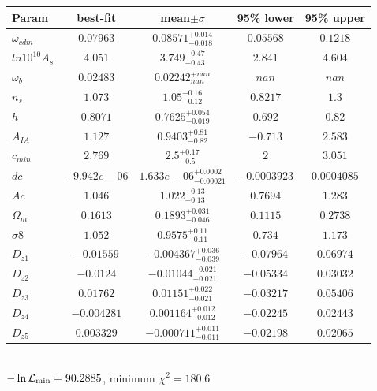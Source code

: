 \begin{tabular}{|l|c|c|c|c|} 
 \hline 
Param & best-fit & mean$\pm\sigma$ & 95\% lower & 95\% upper \\ \hline 
$\omega_{cdm }$ &$0.07963$ & $0.08571_{-0.018}^{+0.014}$ & $0.05568$ & $0.1218$ \\ 
$ln10^{10}A_{s }$ &$4.051$ & $3.749_{-0.43}^{+0.47}$ & $2.841$ & $4.604$ \\ 
$\omega_{b }$ &$0.02483$ & $0.02242_{nan}^{+nan}$ & $nan$ & $nan$ \\ 
$n_{s }$ &$1.073$ & $1.05_{-0.12}^{+0.16}$ & $0.8217$ & $1.3$ \\ 
$h$ &$0.8071$ & $0.7625_{-0.019}^{+0.054}$ & $0.692$ & $0.82$ \\ 
$A_{IA }$ &$1.127$ & $0.9403_{-0.82}^{+0.81}$ & $-0.713$ & $2.583$ \\ 
$c_{min }$ &$2.769$ & $2.5_{-0.5}^{+0.17}$ & $2$ & $3.051$ \\ 
$dc$ &$-9.942e-06$ & $1.633e-06_{-0.00021}^{+0.0002}$ & $-0.0003923$ & $0.0004085$ \\ 
$Ac$ &$1.046$ & $1.022_{-0.13}^{+0.13}$ & $0.7694$ & $1.283$ \\ 
$\Omega_{m }$ &$0.1613$ & $0.1893_{-0.046}^{+0.031}$ & $0.1115$ & $0.2738$ \\ 
$\sigma8$ &$1.052$ & $0.9575_{-0.11}^{+0.11}$ & $0.734$ & $1.173$ \\ 
$D_{z1 }$ &$-0.01559$ & $-0.004367_{-0.039}^{+0.036}$ & $-0.07964$ & $0.06974$ \\ 
$D_{z2 }$ &$-0.0124$ & $-0.01044_{-0.021}^{+0.021}$ & $-0.05334$ & $0.03032$ \\ 
$D_{z3 }$ &$0.01762$ & $0.01151_{-0.021}^{+0.022}$ & $-0.03217$ & $0.05406$ \\ 
$D_{z4 }$ &$-0.004281$ & $0.001164_{-0.012}^{+0.012}$ & $-0.02245$ & $0.02443$ \\ 
$D_{z5 }$ &$0.003329$ & $-0.000711_{-0.011}^{+0.011}$ & $-0.02198$ & $0.02065$ \\ 
\hline 
 \end{tabular} \\ 
$-\ln{\cal L}_\mathrm{min} =90.2885$, minimum $\chi^2=180.6$ \\ 
